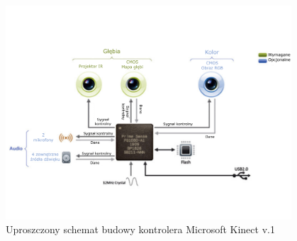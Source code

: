 \begin{savenotes}
	\begin{figure}
		\centering
		\includegraphics[width=0.95\textwidth]{images/kinectSchema.png}
		\caption[Uproszczony schemat budowy kontrolera Microsoft Kinect v.1]{Uproszczony schemat budowy kontrolera Microsoft Kinect v.1 }
		\label{fig:characteristics:kinect:inside} 
	\end{figure}
\end{savenotes}
																															
